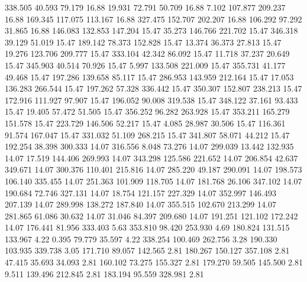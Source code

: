  338.505   40.593   79.179        16.88
  19.931   72.791   50.709        16.88
   7.102  107.877  209.237        16.88
 169.345  117.075  113.167        16.88
 327.475  152.707  202.207        16.88
 106.292   97.292   31.865        16.88
 146.083  132.853  147.204        15.47
  35.273  146.766  221.702        15.47
 346.318   39.129   51.019        15.47
 189.142   78.373  152.828        15.47
  13.374   36.373   27.813        15.47
  19.276  123.706  209.777        15.47
 333.104   42.342   86.092        15.47
  11.718   37.237   20.649        15.47
 345.903   40.514   70.926        15.47
   5.997  133.508  221.009        15.47
 355.731   41.177   49.468        15.47
 197.286  139.658   85.117        15.47
 286.953  143.959  212.164        15.47
  17.053  136.283  266.544        15.47
 197.262   57.328  336.442        15.47
 350.307  152.807  238.213        15.47
 172.916  111.927   97.907        15.47
 196.052   90.008  319.538        15.47
 348.122   37.161   93.433        15.47
  19.405   57.472   51.505        15.47
 356.252   96.282  263.928        15.47
 353.211  165.279  151.578        15.47
 223.729  146.506   52.217        15.47
   4.085   28.987   30.506        15.47
 116.361   91.574  167.047        15.47
 331.032   51.109  268.215        15.47
 341.807   58.071   44.212        15.47
 192.254   38.398  300.333        14.07
 316.556    8.048   73.276        14.07
 299.039   13.442  132.935        14.07
  17.519  144.406  269.993        14.07
 343.298  125.586  221.652        14.07
 206.854   42.637  349.671        14.07
 300.376  110.401  215.816        14.07
 285.220   49.187  290.091        14.07
 198.573  106.140  335.455        14.07
 251.363  101.909  118.705        14.07
 181.768   26.106  347.102        14.07
 190.684   72.746  327.131        14.07
  18.754  121.157  227.329        14.07
 352.997  146.493  207.139        14.07
 289.998  138.272  187.840        14.07
 355.515  102.670  213.299        14.07
 281.865   61.086   30.632        14.07
  31.046   84.397  209.680        14.07
 191.251  121.102  172.242        14.07
 176.441   81.956  333.403         5.63
 353.810   98.420  253.930         4.69
 180.824  131.515  133.967         4.22
   0.395   79.779   35.597         4.22
 338.254  100.469  262.756         3.28
 190.330  103.935  339.738         3.05
 171.710   89.057  142.565         2.81
 180.267  150.127  357.108         2.81
  47.415   35.693   34.093         2.81
 160.102   73.275  155.327         2.81
 179.270   59.505  145.500         2.81
   9.511  139.496  212.845         2.81
 183.194   95.559  328.981         2.81
